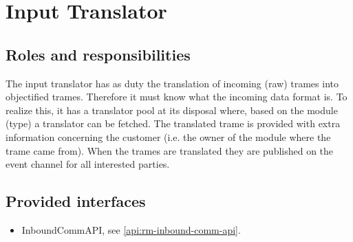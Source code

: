 \section{Input Translator}
\label{element:rm-input-translator}

\subsection{Roles and responsibilities}

\npar The input translator has as duty the translation of incoming (raw) trames
into objectified trames. Therefore it must know what the incoming data format
is. To realize this, it has a translator pool at its disposal where, based on
the module (type) a translator can be fetched. The translated trame is provided
with extra information concerning the customer (i.e. the owner of the module where the
trame came from). When the trames are translated they are published on the event
channel for all interested parties.

\subsection{Provided interfaces}

\begin{itemize}
  \item InboundCommAPI, see \ref{api:rm-inbound-comm-api}.
\end{itemize}